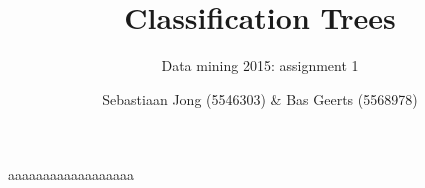 \documentclass[a4paper,12pt]{scrartcl}
\begin{document}
\title{Classification Trees}
\subtitle{Data mining 2015: assignment 1}
\author{Sebastiaan Jong (5546303) \& Bas Geerts (5568978)}
\date{}
\maketitle

aaaaaaaaaaaaaaaaaa
\end{document}
